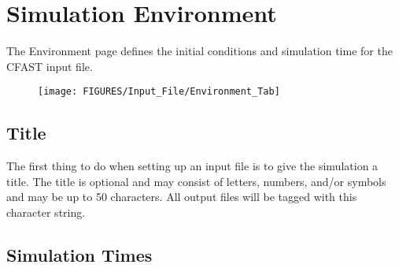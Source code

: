 \chapter{Simulation Environment}

The Environment page defines the initial conditions and simulation time for the CFAST input file.

\begin{figure}[ht]
\centering
\texttt{[image: FIGURES/Input\_File/Environment\_Tab]}
\end{figure}

\section{Title}

The first thing to do when setting up an input file is to give the simulation a title. The title is optional and may consist of letters, numbers, and/or symbols and may be up to 50 characters. All output files will be tagged with this character string.


\section{Simulation Times}

